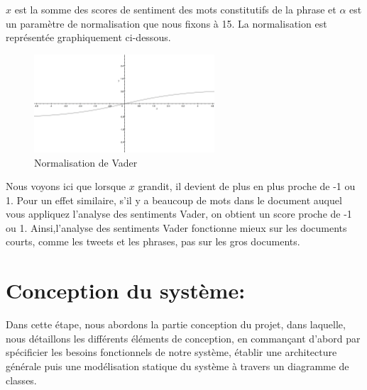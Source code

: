 $x$ est la somme des scores de sentiment des mots constitutifs de la phrase et $\alpha$ est un paramètre de normalisation que nous fixons à 15. La normalisation est représentée graphiquement ci-dessous.
\begin{figure}[H]
    \centering
    \includegraphics[width=0.6\textwidth]{etude-theorique-conception/assets/vader-normalization.png}
    \caption{Normalisation de Vader}
    \label{fig:my_label}
\end{figure}
Nous voyons ici que lorsque $x$ grandit, il devient de plus en plus proche de -1 ou 1. Pour un effet similaire, s'il y a beaucoup de mots dans le document auquel vous appliquez l'analyse des sentiments Vader, on obtient un score proche de -1 ou 1. Ainsi,l'analyse des sentiments Vader fonctionne mieux sur les documents courts, comme les tweets et les phrases, pas sur les gros documents.

\section{Conception du système:}
Dans cette étape, nous abordons la partie conception du projet, dans laquelle, nous
détaillons les différents éléments de conception, en commançant d'abord par spécificier les besoins fonctionnels de notre système, établir une architecture générale puis une modélisation statique du système à travers un diagramme de classes.
